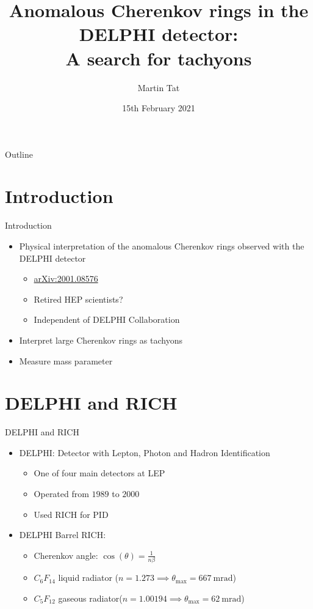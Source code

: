 \documentclass{beamer}
\title[Graduate Symposium]{Anomalous Cherenkov rings in the DELPHI detector:\\A search for tachyons}
\author{Martin Tat}
\institute{University of Oxford}
\date{15th February 2021}
\begin{document}
\begin{frame}
  \titlepage
\end{frame}

\begin{frame}{Outline}
  \tableofcontents
\end{frame}

\section{Introduction}
\begin{frame}{Introduction}
  \begin{itemize}
    \item{Physical interpretation of the anomalous Cherenkov rings observed with the DELPHI detector}
    \begin{itemize}
      \item{\href{https://arxiv.org/abs/2001.08576v1}{arXiv:2001.08576}}
      \item{Retired HEP scientists?}
      \item{Independent of DELPHI Collaboration}
    \end{itemize}
    \item{Interpret large Cherenkov rings as tachyons}
    \item{Measure mass parameter}
  \end{itemize}
\end{frame}

\section{DELPHI and RICH}
\begin{frame}{DELPHI and RICH}
  \begin{itemize}
    \item{DELPHI: Detector with Lepton, Photon and Hadron Identification}
    \begin{itemize}
      \item{One of four main detectors at LEP}
      \item{Operated from $1989$ to $2000$}
      \item{Used RICH for PID}
    \end{itemize}
    \item{DELPHI Barrel RICH:}
    \begin{itemize}
      \item{Cherenkov angle: $\cos(\theta) = \frac{1}{n\beta}$}
      \item{$C_6F_{14}$ liquid radiator ($n = 1.273 \implies \theta_\text{max} = \SI{667}{\milli\radian}$)}
      \item{$C_5F_{12}$ gaseous radiator($n = 1.00194 \implies \theta_\text{max} = \SI{62}{\milli\radian}$)}
    \end{itemize}
  \end{itemize}
\end{frame}
\end{document}

